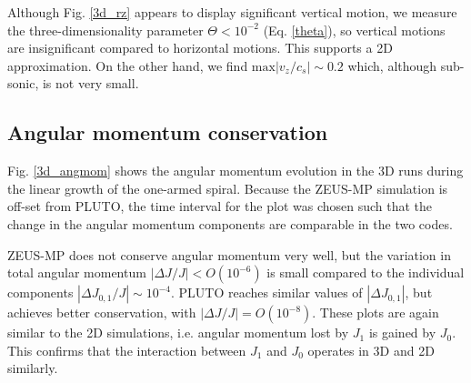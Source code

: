 Although Fig. \ref{3d_rz} appears to display significant vertical motion,
we measure the three-dimensionality parameter $\Theta < 10^{-2}$
(Eq. \ref{theta}), so vertical motions are insignificant compared to
horizontal motions. This supports a 2D approximation. On the other
hand, we find  $\mathrm{max}|v_z/c_s|\sim 0.2$ which, although
sub-sonic, is not very small.  

\subsection{Angular momentum conservation}   
Fig. \ref{3d_angmom} shows the angular momentum evolution in the 3D 
runs during the linear growth of the one-armed spiral. Because the
ZEUS-MP simulation is off-set from PLUTO, the time interval for the
plot was chosen such that the change in the angular momentum
components are comparable in the two codes. 

ZEUS-MP does not conserve angular momentum very well, but the
variation in total angular momentum $|\Delta J/J|< O(10^{-6})$ is
small compared to the individual components $|\Delta J_{0,1}/J|\sim
10^{-4}$. %
PLUTO reaches similar values of $|\Delta J_{0,1}|$, but achieves better
conservation, with $|\Delta J/J|=O(10^{-8})$. These plots are again
similar to the 2D simulations, i.e. angular momentum lost by $J_1$ is
gained by $J_0$. This confirms that the interaction between $J_1$ and
$J_0$ operates in 3D and 2D similarly.  

